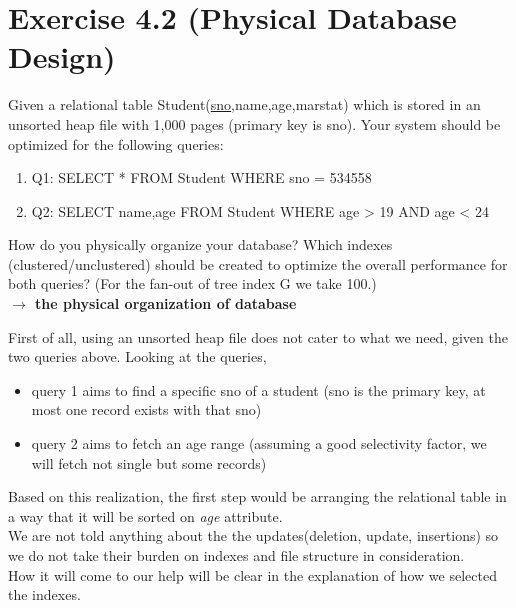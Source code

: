 \documentclass[10pt]{article}
\newcommand{\forceindent}{\leavevmode{\parindent=1em\indent}}
\begin{document}
	
	\section*{Exercise 4.2 (Physical Database Design)}
	
	\indent Given a relational table Student(\underline{sno},name,age,marstat) which is stored in an unsorted heap file with 1,000 pages (primary key is sno). Your system should be optimized for the following queries:
	
	\begin{enumerate}
		\item Q1: SELECT * FROM Student WHERE sno = 534558
		
		\item Q2: SELECT name,age FROM Student WHERE age > 19 AND age < 24
	\end{enumerate}
	
	How do you physically organize your database? Which indexes (clustered/unclustered) should be created to optimize the overall performance for both queries? (For the fan-out of tree index G we take 100.)\\
	
	\textbf{$\rightarrow$ the physical organization of database}\\
	
	\begin{addmargin}[4em]{2em}
	\forceindent First of all, using an unsorted heap file does not cater to what we need, given the two queries above. Looking at the queries,
	
	\begin{addmargin}[2em]{4em}
		\begin{itemize}
			\item query 1 aims to find a specific sno of a student (sno is the primary key, at most one record exists with that sno)
			
			\item query 2 aims to fetch an age range (assuming a good selectivity factor, we will fetch not single but some records)
		\end{itemize}\bigskip
	\end{addmargin}	
	\forceindent Based on this realization, the first step would be arranging the relational table in a way that it will be sorted on \textit{age} attribute.\\
	\forceindent We are not told anything about the the updates(deletion, update, insertions) so we do not take their burden on indexes and file structure in consideration.\\	
	\forceindent How it will come to our help will be clear in the explanation of how we selected the indexes.
	
	\end{addmargin}
	
\end{document}
